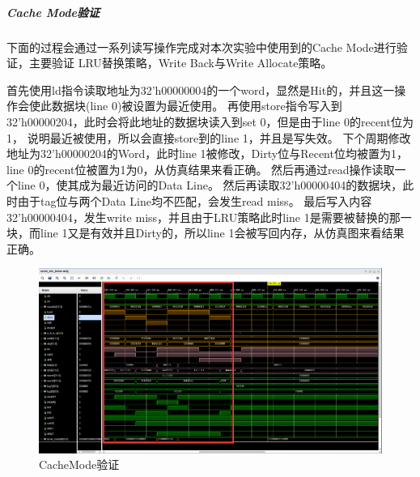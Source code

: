 \subparagraph{Cache Mode验证}
下面的过程会通过一系列读写操作完成对本次实验中使用到的Cache Mode进行验证，主要验证
LRU替换策略，Write Back与Write Allocate策略。

首先使用ld指令读取地址为32'h00000004的一个word，显然是Hit的，并且这一操作会使此数据块(line 0)被设置为最近使用。
再使用store指令写入到32'h00000204，此时会将此地址的数据块读入到set 0，但是由于line 0的recent位为1，
说明最近被使用，所以会直接store到的line 1，并且是写失效。
下个周期修改地址为32'h00000204的Word，此时line 1被修改，Dirty位与Recent位均被置为1，line 0的recent位被置为1为0，从仿真结果来看正确。
然后再通过read操作读取一个line 0，使其成为最近访问的Data Line。
然后再读取32'h00000404的数据块，此时由于tag位与两个Data Line均不匹配，会发生read miss。
最后写入内容32'h00000404，发生write miss，并且由于LRU策略此时line 1是需要被替换的那一块，而line 1又是有效并且Dirty的，所以line 1会被写回内存，从仿真图来看结果正确。

\begin{figure}[H] %
	\centering %
	\includegraphics[width=1.0\textwidth]{figs/res5.png} %
	\caption{CacheMode验证} %
	\label{Fig.6} %
\end{figure}